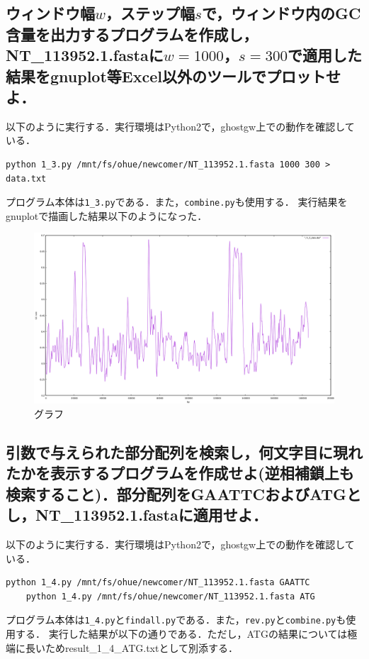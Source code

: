\documentclass[uplatex,a4j]{jsarticle}
\begin{document}
  \subsection{ウィンドウ幅$w$，ステップ幅$s$で，ウィンドウ内のGC含量を出力するプログラムを作成し，NT\_113952.1.fastaに$w=1000$，$s=300$で適用した結果をgnuplot等Excel以外のツールでプロットせよ．}
  以下のように実行する．実行環境はPython2で，ghostgw上での動作を確認している．
  \begin{lstlisting}[caption=実行方法, label=run3]
    python 1_3.py /mnt/fs/ohue/newcomer/NT_113952.1.fasta 1000 300 > data.txt
  \end{lstlisting}
  プログラム本体は{\tt 1\_3.py}である．また，{\tt combine.py}も使用する．
  実行結果をgnuplotで描画した結果以下のようになった．
  \begin{figure}[htbp]
    \begin{center}
      \includegraphics[width=15cm]{1_3_plot.png}
      \caption{グラフ}
    \end{center}
  \end{figure}
  
  \subsection{引数で与えられた部分配列を検索し，何文字目に現れたかを表示するプログラムを作成せよ(逆相補鎖上も検索すること)．部分配列をGAATTCおよびATGとし，NT\_113952.1.fastaに適用せよ．}
  以下のように実行する．実行環境はPython2で，ghostgw上での動作を確認している．
  \begin{lstlisting}[caption=実行方法, label=run4]
    python 1_4.py /mnt/fs/ohue/newcomer/NT_113952.1.fasta GAATTC
    python 1_4.py /mnt/fs/ohue/newcomer/NT_113952.1.fasta ATG
  \end{lstlisting}
  プログラム本体は{\tt 1\_4.py}と{\tt findall.py}である．また，{\tt rev.py}と{\tt combine.py}も使用する．
  実行した結果が以下の通りである．ただし，ATGの結果については極端に長いためresult\_1\_4\_ATG.txtとして別添する．
  
  
\end{document}
